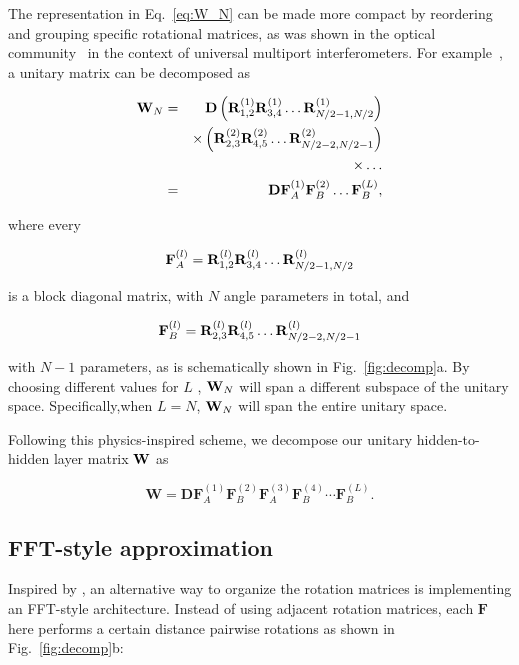 The representation in Eq.~\ref{eq:W_N} can be made more compact by reordering and grouping specific rotational matrices, as was shown in the optical community~\cite{Reck1994experimental,Clements2015optimal} in the context of universal multiport interferometers. For example~\cite{Clements2015optimal}, a unitary matrix can be decomposed as

\begin{eqnarray}
{\bf W}_N&=&{\bf D}
\left({\bf R}_{1,2}^{(1)}{\bf R}_{3,4}^{(1)}\dots{\bf R}_{N/2-1,N/2}^{(1)}\right)\nonumber\\
&&\times\left({\bf R}_{2,3}^{(2)}{\bf R}_{4,5}^{(2)}\dots{\bf R}_{N/2-2,N/2-1}^{(2)}\right)\nonumber\\
&&\times\dots\nonumber\\
&=&{\bf D} {\bf F}_{A}^{(1)} {\bf F}_B^{(2)} \dots {\bf F}_{B}^{(L)} ,
\label{Eqn:FA}
\end{eqnarray}

where every

\begin{eqnarray}

\mathbf{F}_A^{(l)} ={\bf R}_{1,2}^{(l)}{\bf R}_{3,4}^{(l)}\dots{\bf R}_{N/2-1,N/2}^{(l)}\nonumber

\end{eqnarray}

is a block diagonal matrix, with $N$ angle parameters in total, and

\begin{eqnarray}
\mathbf{F}_B^{(l)} ={\bf R}_{2,3}^{(l)}{\bf R}_{4,5}^{(l)}\dots{\bf R}_{N/2-2,N/2-1}^{(l)} \nonumber

\end{eqnarray}

with $N-1$ parameters, as is schematically shown in Fig.~\ref{fig:decomp}a.
By choosing different values for $L$ , ${\bf W}_N$ will span a different subspace of the unitary space. Specifically,when $L=N$, ${\bf W}_N$ will span the entire unitary space. 

Following this physics-inspired scheme, we decompose our unitary hidden-to-hidden layer matrix ${\bf W}$ as

\begin{equation}
\mathbf{W} = \mathbf{D}\mathbf{F}_A^{(1)}\mathbf{F}_B^{(2)}\mathbf{F}_A^{(3)}\mathbf{F}_B^{(4)}\cdots\mathbf{F}_B^{(L)}.
\end{equation}

\subsection{FFT-style approximation} Inspired by \cite{michael2014mathieu}, an alternative way to organize the rotation matrices is implementing an FFT-style architecture. Instead of using adjacent rotation matrices, each $\mathbf{F}$ here performs a certain distance pairwise rotations as shown in Fig.~\ref{fig:decomp}b:

